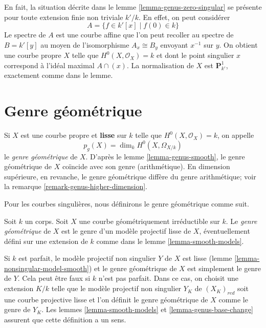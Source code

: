 \begin{example}
\label{example-squish-on-P1}
En fait, la situation décrite dans le lemme \ref{lemma-genus-zero-singular} se présente pour toute extension finie non triviale $k'/k$. En effet, on peut considérer $$
A = \{f \in k'[x] \mid f(0) \in k \}
$$ Le spectre de $A$ est une courbe affine que l'on peut recoller au spectre de $B = k'[y]$ au moyen de l'isomorphisme $A_x \cong B_y$ envoyant $x^{-1}$ sur $y$. On obtient une courbe propre $X$ telle que $H^0(X, \mathcal{O}_X) = k$ et dont le point singulier $x$ correspond à l'idéal maximal $A \cap (x)$. La normalisation de $X$ est $\mathbf{P}^1_{k'}$, exactement comme dans le lemme.
\end{example}








\section{Genre géométrique}
\label{section-geometric-genus}

\noindent
Si $X$ est une courbe propre et {\bf lisse} sur $k$ telle que $H^0(X, \mathcal{O}_X) = k$, on appelle $$
p_g(X) = \dim_k H^0(X, \Omega_{X/k})
$$ le {\it genre géométrique} de $X$. D'après le lemme \ref{lemma-genus-smooth}, le genre géométrique de $X$ coïncide avec son genre (arithmétique). En dimension supérieure, en revanche, le genre géométrique diffère du genre arithmétique; voir la remarque \ref{remark-genus-higher-dimension}.

\medskip\noindent
Pour les courbes singulières, nous définirons le genre géométrique comme suit.

\begin{definition}
\label{definition-geometric-genus}
Soit $k$ un corps. Soit $X$ une courbe géométriquement irréductible sur $k$. Le {\it genre géométrique} de $X$ est le genre d'un modèle projectif lisse de $X$, éventuellement défini sur une extension de $k$ comme dans le lemme \ref{lemma-smooth-models}.
\end{definition}

\noindent
Si $k$ est parfait, le modèle projectif non singulier $Y$ de $X$ est lisse (lemme \ref{lemma-nonsingular-model-smooth}) et le genre géométrique de $X$ est simplement le genre de $Y$. Cela peut être faux si $k$ n'est pas parfait. Dans ce cas, on choisit une extension $K/k$ telle que le modèle projectif non singulier $Y_K$ de $(X_K)_{red}$ soit une courbe projective lisse et l'on définit le genre géométrique de $X$ comme le genre de $Y_K$. Les lemmes \ref{lemma-smooth-models} et \ref{lemma-genus-base-change} assurent que cette définition a un sens.

